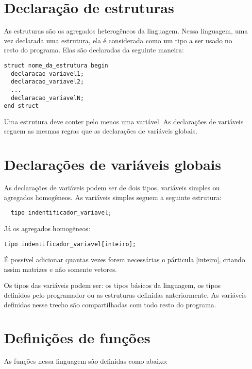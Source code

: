   \section{Declaração de estruturas}

  As estruturas são os agregados heterogêneos da linguagem. Nessa linguagem, uma vez declarada uma estrutura, ela é considerada como um tipo a ser usado no resto do programa. Elas são declaradas da seguinte maneira:

\begin{lstlisting}
struct nome_da_estrutura begin 
  declaracao_variavel1; 
  declaracao_variavel2; 
  ... 
  declaracao_variavelN; 
end struct
\end{lstlisting}

  Uma estrutura deve conter pelo menos uma variável. As declarações de variáveis seguem as mesmas regras que as declarações de variáveis globais.

  \section{Declarações de variáveis globais}

  As declarações de variáveis podem ser de dois tipos, variáveis simples ou agregados homogêneos. As variáveis simples seguem a seguinte estrutura:

\begin{lstlisting}
  tipo indentificador_variavel;
\end{lstlisting}

  Já os agregados homogêneos:

\begin{lstlisting}
tipo indentificador_variavel[inteiro];
\end{lstlisting}

  É possível adicionar quantas vezes forem necessárias o párticula [inteiro], criando assim matrizes e não somente vetores.

  Os tipos das variáveis podem ser: os tipos básicos da linguagem, os tipos definidos pelo programador ou as estruturas definidas anteriormente. As variáveis definidas nesse trecho são compartilhadas com todo resto do programa.

  \section{Definições de funções}

  As funções nessa linguagem são definidas como abaixo:

